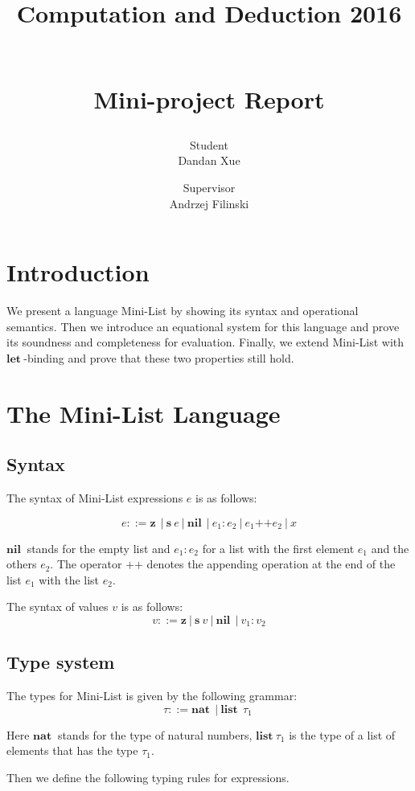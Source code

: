 \documentclass[a4paper]{article}
\title{ \begin{large}  Computation and Deduction 2016 \end{large}  \\ [2ex] 	Mini-project Report }
\author{ Student \\ Dandan Xue
	\and Supervisor \\
	Andrzej Filinski}
\theoremstyle{plain}
\def\*#1{\mathbf{#1}\ }
\def\Z{\mathbf{z}}   %
\def\PP{\operatorname{++}}
\begin{document}
\maketitle

\tableofcontents

\clearpage

\section{Introduction}
We present a language Mini-List by showing its syntax and operational semantics. Then we introduce an equational system for this language and prove its soundness and completeness for evaluation. Finally, we extend Mini-List with $\*{let}$-binding and prove that these two properties still hold.
 

\section{The Mini-List Language}

\subsection{Syntax}

The syntax of Mini-List expressions  $e$ is as follows:

$$e ::= \*{z} \ |\ \*{s} e \ |\ \*{nil} \ |\  e_1: e_2  \ |\ e_1 \PP  e_2 \ | \ x$$

$\*{nil}$ stands for the empty list and $e_1:e_2$ for a list with the first element $e_1$ and the others $e_2$. The operator $\PP$  denotes the appending operation at the end of the list $e_1$ with the list $e_2$.

The syntax of values $v$ is as follows:
	$$v ::= \Z \ | \ \*{s} v \ | \ \*{nil} \ | \ v_1:v_2$$


\subsection{Type system}

The types for Mini-List is given by the following grammar: 
$$\tau ::= \*{nat} \ |\ \*{list} \ \tau_1 \ $$

Here $\*{nat}$ stands for the type of natural numbers, $\*{list} \tau_1$ is the type of a list of elements that has the type $\tau_1$.

Then we define the following typing rules for expressions.
\end{document}
